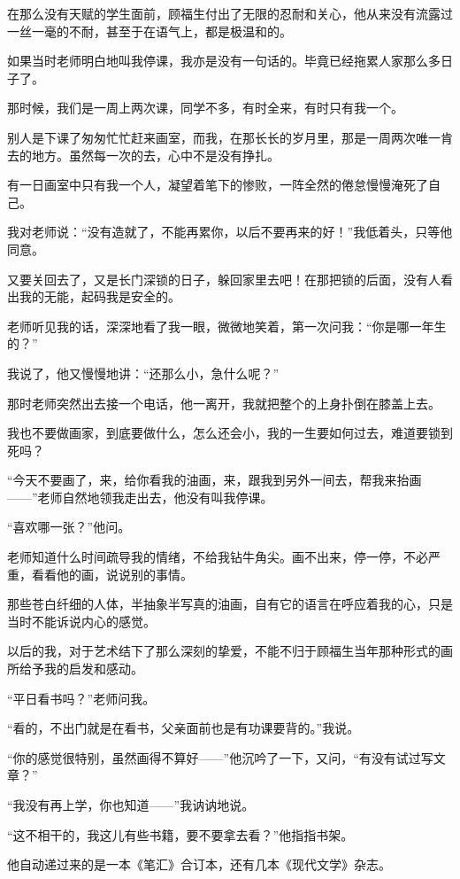 \par 在那么没有天赋的学生面前，顾福生付出了无限的忍耐和关心，他从来没有流露过一丝一毫的不耐，甚至于在语气上，都是极温和的。
\par 如果当时老师明白地叫我停课，我亦是没有一句话的。毕竟已经拖累人家那么多日子了。
\par 那时候，我们是一周上两次课，同学不多，有时全来，有时只有我一个。
\par 别人是下课了匆匆忙忙赶来画室，而我，在那长长的岁月里，那是一周两次唯一肯去的地方。虽然每一次的去，心中不是没有挣扎。
\par 有一日画室中只有我一个人，凝望着笔下的惨败，一阵全然的倦怠慢慢淹死了自己。
\par 我对老师说：“没有造就了，不能再累你，以后不要再来的好！”我低着头，只等他同意。
\par 又要关回去了，又是长门深锁的日子，躲回家里去吧！在那把锁的后面，没有人看出我的无能，起码我是安全的。
\par 老师听见我的话，深深地看了我一眼，微微地笑着，第一次问我：“你是哪一年生的？”
\par 我说了，他又慢慢地讲：“还那么小，急什么呢？”
\par 那时老师突然出去接一个电话，他一离开，我就把整个的上身扑倒在膝盖上去。
\par 我也不要做画家，到底要做什么，怎么还会小，我的一生要如何过去，难道要锁到死吗？
\par “今天不要画了，来，给你看我的油画，来，跟我到另外一间去，帮我来抬画——”老师自然地领我走出去，他没有叫我停课。
\par “喜欢哪一张？”他问。
\par 老师知道什么时间疏导我的情绪，不给我钻牛角尖。画不出来，停一停，不必严重，看看他的画，说说别的事情。
\par 那些苍白纤细的人体，半抽象半写真的油画，自有它的语言在呼应着我的心，只是当时不能诉说内心的感觉。
\par 以后的我，对于艺术结下了那么深刻的挚爱，不能不归于顾福生当年那种形式的画所给予我的启发和感动。
\par “平日看书吗？”老师问我。
\par “看的，不出门就是在看书，父亲面前也是有功课要背的。”我说。
\par “你的感觉很特别，虽然画得不算好——”他沉吟了一下，又问，“有没有试过写文章？”
\par “我没有再上学，你也知道——”我讷讷地说。
\par “这不相干的，我这儿有些书籍，要不要拿去看？”他指指书架。
\par 他自动递过来的是一本《笔汇》合订本，还有几本《现代文学》杂志。
